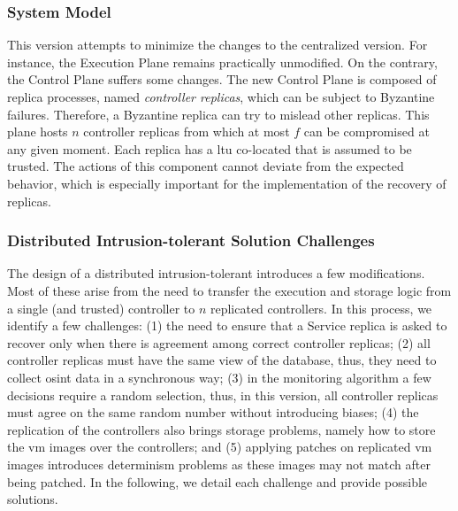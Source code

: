 \subsubsection{System Model}

This \system version attempts to minimize the changes to the centralized version.
For instance, the Execution Plane remains practically unmodified.
On the contrary, the Control Plane suffers some changes.
The new Control Plane is composed of replica processes, named \emph{controller replicas}, which can be subject to Byzantine failures.
Therefore, a Byzantine replica can try to mislead other replicas.
This plane hosts $n$ controller replicas from which at most $f$ can be compromised at any given moment.
Each replica has a \gls{ltu} co-located that is assumed to be trusted. 
The actions of this component cannot deviate from the expected behavior, which is especially important for the implementation of the recovery of replicas.



\subsubsection{Distributed Intrusion-tolerant Solution Challenges}
The design of a distributed intrusion-tolerant \system introduces a few modifications.
Most of these arise from the need to transfer the execution and storage logic from a single (and trusted) controller to $n$ replicated controllers.
In this process, we identify a few challenges:
(1) the need to ensure that a Service replica is asked to recover only when there is agreement among correct controller replicas;
(2) all controller replicas must have the same view of the database, thus, they need to collect \gls{osint} data in a synchronous way;
(3) in the \system monitoring algorithm a few decisions require a random selection, thus, in this version, all controller replicas must agree on the same random number without introducing biases;
(4) the replication of the controllers also brings storage problems, namely how to store the \gls{vm} images over the controllers;
and (5) applying patches on replicated \gls{vm} images introduces determinism problems as these images may not match after being patched.
In the following, we detail each challenge and provide possible solutions.
 
